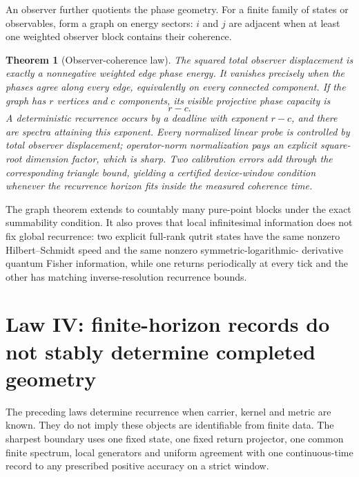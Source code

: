 \documentclass[10pt]{article}
\newtheorem{theorem}{Theorem}
\theoremstyle{definition}
\begin{document}
An observer further quotients the phase geometry.  For a finite family of
states or observables, form a graph on energy sectors: $i$ and $j$ are
adjacent when at least one weighted observer block contains their coherence.

\begin{theorem}[Observer-coherence law]
\label{thm:observer}
The squared total observer displacement is exactly a nonnegative weighted
edge phase energy.  It vanishes precisely when the phases agree along every
edge, equivalently on every connected component.  If the graph has $r$
vertices and $c$ components, its visible projective phase capacity is
\begin{equation}
 r-c.                                                   \label{eq:graphrank}
\end{equation}
A deterministic recurrence occurs by a deadline with exponent $r-c$, and
there are spectra attaining this exponent.  Every normalized linear probe is
controlled by total observer displacement; operator-norm normalization pays
an explicit square-root dimension factor, which is sharp.  Two calibration
errors add through the corresponding triangle bound, yielding a certified
device-window condition whenever the recurrence horizon fits inside the
measured coherence time.
\end{theorem}

The graph theorem extends to countably many pure-point blocks under the exact
summability condition.  It also proves that local infinitesimal information
does not fix global recurrence: two explicit full-rank qutrit states have the
same nonzero Hilbert--Schmidt speed and the same nonzero symmetric-logarithmic-
derivative quantum Fisher information, while one returns periodically at
every tick and the other has matching inverse-resolution recurrence bounds.

\section{Law IV: finite-horizon records do not stably determine completed geometry}

The preceding laws determine recurrence when carrier, kernel and metric are
known.  They do not imply these objects are identifiable from finite data.
The sharpest boundary uses one fixed state, one fixed return projector, one
common finite spectrum, local generators and uniform agreement with one
continuous-time record to any prescribed positive accuracy on a strict
window.
\end{document}
